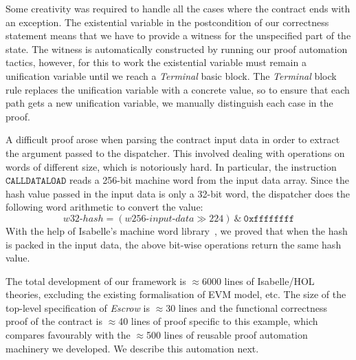 \documentclass[sigplan,10pt]{acmart}\settopmatter{printfolios=true,printccs=false,printacmref=false}
\newcommand{\instr}[1]{\mathtt{#1}}
\begin{document}
Some creativity was required to handle all the cases where the
contract ends with an exception.
The existential variable in the postcondition of our correctness
statement means that we have to provide a witness for the
unspecified part of the state.
The witness is automatically constructed by running our
proof automation tactics, however, for this to work the
existential variable must remain a unification variable until
we reach a \textit{Terminal} basic block.
The \textit{Terminal} block rule replaces the
unification variable with a concrete value,
so to ensure that each path gets a new unification
variable, we manually distinguish each case in the proof.

A difficult proof arose when parsing the contract input data
in order to extract the argument passed to the dispatcher.
This involved dealing with operations on words of different size,
which is notoriously hard.
In particular, the instruction $\instr{CALLDATALOAD}$ reads a
256-bit machine word from the input data array.
Since the hash value passed in the input data is only a 32-bit word,
the dispatcher does the following word arithmetic to convert the value:
\[
\mathit{w32}\mbox{-}\mathit{hash} = (\mathit{w256}\mbox{-}\mathit{input}\mbox{-}\mathit{data} \gg 224)\ \text{\&}\ \mathtt{0xffffffff}
\]
With the help of Isabelle's machine word library~\cite{Word_Lib-AFP},
we proved that when the hash is packed in the input data,
the above bit-wise operations return the same hash value.


The total development of our framework is $\approx$6000 lines of Isabelle/HOL theories,
excluding the existing formalisation of EVM model, etc.
The size of the top-level specification of \textit{Escrow} is $\approx$30 lines
and the functional correctness proof of the contract is
$\approx$40 lines of proof specific to this example, which compares
favourably with the $\approx$500 lines of reusable proof
automation machinery we developed.
We describe this automation next.




\end{document}
